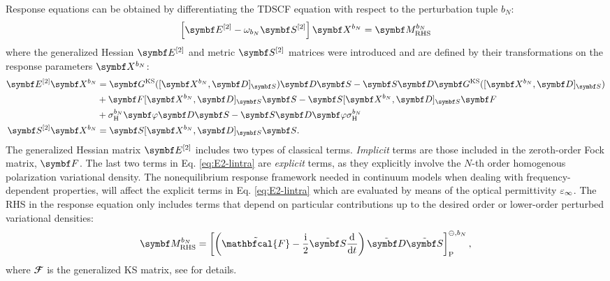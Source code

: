 Response equations can be obtained by differentiating the
\acrshort{TDSCF} equation with respect to the perturbation tuple
$b_N$:\autocite{Thorvaldsen2008-sg, Ringholm2014-gx}
\begin{equation}\label{eq:response-equation}
 \left[\genHessian - \omega_{b_N}\genMetric \right]\rspParam{b_N} = \RHS{b_N}
\end{equation}
where the generalized Hessian $\genHessian$ and metric $\genMetric$
matrices were introduced and are defined by their transformations on the
response parameters $\rspParam{b_N}$:\autocite{Larsen2000-hj,
Kjaergaard2008-hy}
\begin{subequations}
\begin{align}
  \genHessian\rspParam{b_N} &=
  \mat{G}^\mathrm{KS}([\rspParam{b_N}, \mat{D}]_{\mat{S}})\mat{D}\mat{S}
  -\mat{S}\mat{D}\mat{G}^\mathrm{KS}([\rspParam{b_N},
  \mat{D}]_{\mat{S}}) \nonumber \\
&+\mat{F} [\rspParam{b_N}, \mat{D}]_{\mat{S}} \mat{S}
-\mat{S} [\rspParam{b_N}, \mat{D}]_{\mat{S}} \mat{F}
\label{eq:E2-lintra} \\
&+ \ASCh{b_N}\mat{\esp}\mat{D}\mat{S}
-\mat{S}\mat{D}\mat{\esp}\ASCh{b_N} \nonumber
\\
  \genMetric\rspParam{b_N} &= \mat{S} [\rspParam{b_N}, \mat{D}]_{\mat{S}} \mat{S} \text{.}
  \label{eq:S2-lintra}
\end{align}
\end{subequations}
The generalized Hessian matrix $\genHessian$ includes two types of
classical terms. \emph{Implicit} terms are those included in the
zeroth-order Fock matrix, $\mat{F}$.
The last two terms in Eq. \ref{eq:E2-lintra} are \emph{explicit} terms,
as they explicitly involve the $N$-th order homogenous polarization
variational density.
The nonequilibrium response framework needed in continuum models when
dealing with frequency-dependent properties,\autocite{Cammi1999-rb, Tomasi2005-vm}
will affect the explicit terms in Eq. \ref{eq:E2-lintra} which are
evaluated by means of the optical permittivity $\varepsilon_\infty$.
The \acrlong*{RHS} in the response equation only includes terms that
depend on particular contributions up to the desired order or
lower-order perturbed variational densities:\autocite{Ringholm2014-gx}
\begin{equation}\label{eq:RHS}
  \RHS{b_N} =
  \left[\left( \tilde{\mathbfcal{F}}
-
\frac{\mathrm{i}}{2}\pertmat{S}\deriv{}{t}\right)\pertmat{D}\pertmat{S}\right]^{\ominus,
b_N}_\mathrm{P},
\end{equation}
where $\mathbfcal{F}$ is the generalized \acrshort*{KS} matrix, see
 for details.

